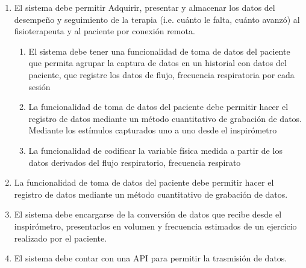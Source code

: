 \documentclass[12pt]{article}
\begin{document}
\begin{enumerate}[start=1,label={\bfseries RF0\arabic*.}]
 
     
         
    
 
    
    
    \item El sistema debe permitir Adquirir, presentar y almacenar los datos del desempeño y seguimiento de la terapia (i.e. cuánto le falta, cuánto avanzó) al fisioterapeuta y al paciente por conexión remota.
     \label{RF12}
            \begin{enumerate}[label*=\arabic*.]
                
                \item El sistema debe tener una funcionalidad de toma de datos del paciente que permita agrupar la captura de datos en un historial con datos del paciente, que registre los datos de flujo, frecuencia respiratoria por cada sesión 
                
                \item La funcionalidad de toma de datos del paciente debe permitir hacer el registro de datos mediante un método cuantitativo de grabación de datos. Mediante los estímulos capturados uno a uno desde el inspirómetro %
                
                \item La funcionalidad de codificar la variable física medida a partir de los datos derivados del flujo respiratorio, frecuencia respirato %
            
            \end{enumerate}
            
    \item La funcionalidad de toma de datos del paciente debe permitir hacer el registro de datos mediante un método cuantitativo de grabación de datos.
            
        
    \item El sistema debe encargarse de la conversión de datos que recibe desde el inspirómetro, presentarlos en volumen y frecuencia estimados de un ejercicio realizado por el paciente.
       

    
    
    \item El sistema debe contar con una API para permitir la trasmisión de datos.
    

\end{enumerate}
\end{document}
